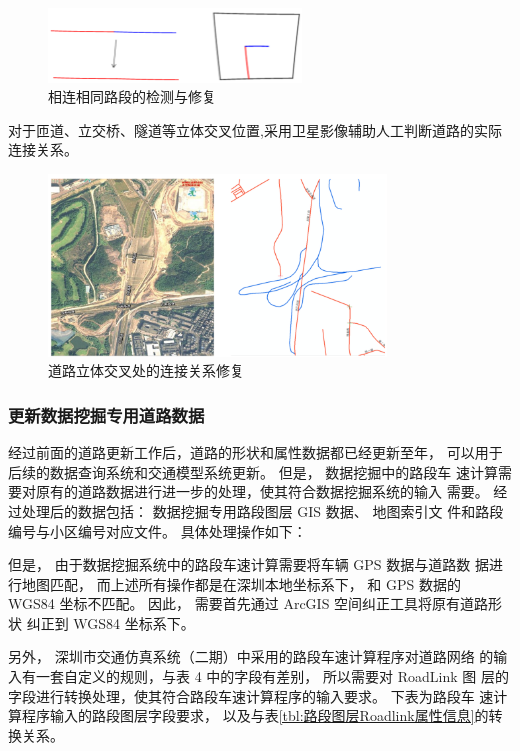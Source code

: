 \begin{figure}[!ht]
  \centering
  \includegraphics[width=0.6\textwidth]{figures/chp02_相连相同路段的检测与修复.png}
  \caption{相连相同路段的检测与修复\label{fig:相连相同路段的检测与修复}}
\end{figure}

对于匝道、立交桥、隧道等立体交叉位置,采用卫星影像辅助人工判断道路的实际连接关系。

\begin{figure}[!ht]
  \centering
  \includegraphics[width=0.8\textwidth]{figures/chp02_道路立体交叉处的连接关系修复.png}
  \caption{道路立体交叉处的连接关系修复\label{fig:道路立体交叉处的连接关系修复}}
\end{figure}

\subsubsection{更新数据挖掘专用道路数据}
经过前面的道路更新工作后，道路的形状和属性数据都已经更新至\pyear 年，
可以用于后续的数据查询系统和交通模型系统更新。 但是， 数据挖掘中的路段车
速计算需要对原有的道路数据进行进一步的处理，使其符合数据挖掘系统的输入
需要。 经过处理后的数据包括： 数据挖掘专用路段图层 GIS 数据、 地图索引文
件和路段编号与小区编号对应文件。 具体处理操作如下：

但是， 由于数据挖掘系统中的路段车速计算需要将车辆 GPS 数据与道路数
据进行地图匹配， 而上述所有操作都是在深圳本地坐标系下， 和 GPS 数据的
WGS84 坐标不匹配。 因此， 需要首先通过 ArcGIS 空间纠正工具将原有道路形状
纠正到 WGS84 坐标系下。

另外， 深圳市交通仿真系统（二期）中采用的路段车速计算程序对道路网络
的输入有一套自定义的规则，与表 4 中的字段有差别， 所以需要对 RoadLink 图
层的字段进行转换处理，使其符合路段车速计算程序的输入要求。 下表为路段车
速计算程序输入的路段图层字段要求， 以及与表\ref{tbl:路段图层Roadlink属性信息}的转换关系。

